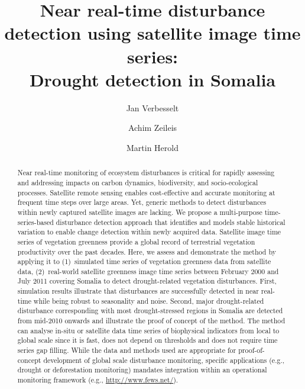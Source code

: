 \documentclass[authoryear,preprint,review,10pt]{elsarticle}
\begin{document}

\begin{frontmatter}

    \title
    {
Near real-time disturbance detection using satellite image time series: \\ Drought detection in Somalia
    }
    \author[WUR]{Jan Verbesselt}
    \author[UIBK]{Achim Zeileis}
    \author[WUR]{Martin Herold}
    \address[WUR]{Remote Sensing Team, Wageningen University, \\
           Droevendaalsesteeg 3, Wageningen 6708 PB, The Netherlands \\
           \emph{Ph}: + 31 317 48 52 68; \emph{Fax}: +31 317 419000}
    \address[UIBK]{Department of Statistics, Universit\"at Innsbruck, \\
           Universit\"atsstr.~15, 6020 Innsbruck, Austria}

\begin{abstract}
Near real-time monitoring of ecosystem disturbances is critical for rapidly assessing and addressing impacts on carbon dynamics, biodiversity, and socio-ecological processes. Satellite remote sensing enables cost-effective and accurate monitoring at frequent time steps over large areas. Yet, generic methods to detect disturbances within newly captured satellite images are lacking. 
We propose a multi-purpose time-series-based disturbance detection approach that identifies and models stable historical variation to enable change detection within newly acquired data.
Satellite image time series of vegetation greenness provide a global record of terrestrial vegetation productivity over the past decades. Here, we assess and demonstrate the method by applying it to (1)~simulated time series of vegetation greenness data from satellite data, (2)~real-world satellite greenness image time series between February 2000 and July 2011 covering Somalia to  detect drought-related vegetation disturbances.
First, simulation results illustrate that disturbances are successfully detected in near real-time while being robust to seasonality and noise. Second, major drought-related disturbance corresponding with most drought-stressed regions in Somalia are detected from mid-2010 onwards and illustrate the proof of concept of the method. The method can analyse in-situ or satellite data time series of biophysical indicators from local to global scale since it is fast, does not depend on thresholds and does not require time series gap filling. While the data and methods used are appropriate for proof-of-concept development of global scale disturbance monitoring, specific applications (e.g., drought or deforestation monitoring) mandates integration within an operational monitoring framework (e.g., \url{http://www.fews.net/}).
\end{abstract}



\end{frontmatter}
\end{document}
